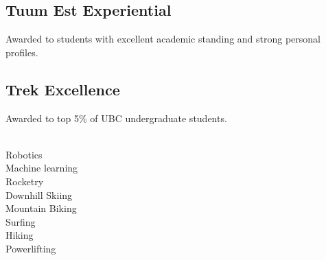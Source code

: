 \documentclass[a4paper]{MagicalCV}
\begin{document}
\begin{minipage}[t]{0.3\textwidth}
\subsection{Tuum Est Experiential}
\vspace{\topsep} %
Awarded to students with excellent academic standing and strong personal profiles.
\sectionsep

\subsection{Trek Excellence}
\vspace{\topsep} %
Awarded to top 5\% of UBC undergraduate students.
\sectionsep

\\
Robotics \\
Machine learning  \\
Rocketry\\
Downhill Skiing \\
Mountain Biking \\
Surfing \\
Hiking\\
Powerlifting \\

\sectionsep

\end{minipage} 
\hfill
\end{document}
